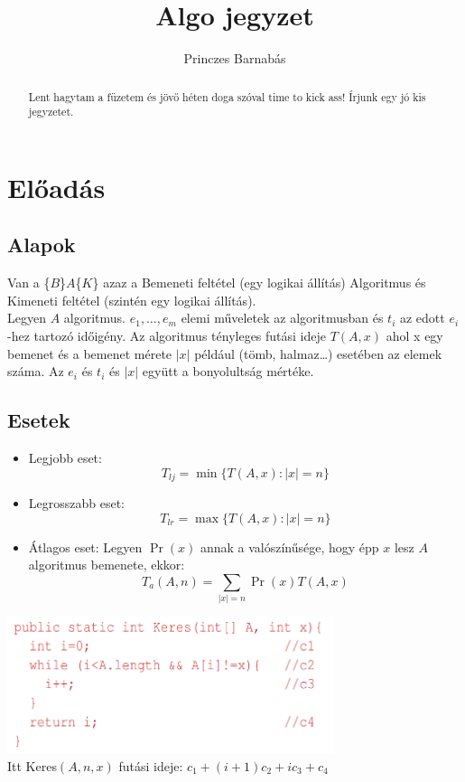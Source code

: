 \documentclass{article}
\title{Algo jegyzet}
\author{Princzes
Barnabás}
\theoremstyle{mytheoremstyle}
\theoremstyle{mytheoremstyle}
\theoremstyle{myproblemstyle}
\begin{document}
\maketitle
\begin{abstract}
    Lent hagytam a füzetem és jövő héten doga szóval time to kick ass!
    Írjunk egy jó kis jegyzetet.
\end{abstract}
\section{Előadás}
\subsection{Alapok}
Van a \{$B$\}$A$\{$K$\} azaz a Bemeneti
feltétel (egy logikai állítás) Algoritmus és Kimeneti feltétel
(szintén egy logikai állítás).
\\
Legyen $A$ algoritmus. $e_1,\ldots,e_m$ elemi műveletek az algoritmusban
és $t_i$ az edott $e_i$-hez tartozó időigény. Az algoritmus tényleges futási ideje
$T(A,x)$ ahol x egy bemenet és a bemenet mérete $|x|$ például
(tömb, halmaz\ldots) esetében az elemek száma.
Az $e_i$ és $t_i$ és $|x|$ együtt a bonyolultság mértéke.

\subsection{Esetek}
\begin{itemize}
    \item Legjobb eset: \[T_{lj} = \min \{T(A,x):|x|=n\}\]
    \item Legrosszabb eset: \[T_{lr} = \max\{T(A,x):|x|=n\}\]
    \item Átlagos eset: Legyen $\Pr(x)$ annak
          a valószínűsége, hogy épp $x$ lesz
          $A$ algoritmus bemenete, ekkor:
          \\ \[T_a(A,n) = \sum_{|x|=n}\Pr(x)T(A,x)\]
\end{itemize}
\begin{center}
    \includegraphics[height=4cm]{keres}
    \\
    Itt Keres$(A,n,x)$ futási ideje: $c_1+(i+1)c_2+ic_3+c_4$
\end{center}
\end{document}
